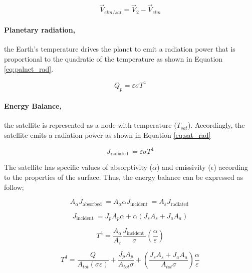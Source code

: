 \documentclass[11pt]{article}
\begin{document}
\begin{equation}
    \vec{V}_{elm/sat} = \vec{V}_{2} - \vec{V}_{elm}
\end{equation}


\paragraph{Planetary radiation,} the Earth's temperature drives the planet to emit a radiation power that is proportional to the quadratic of the temperature as shown in Equation \ref{eq:palnet_rad}.

\begin{equation}\label{eq:palnet_rad}
    Q_p = \varepsilon \sigma T^4
\end{equation}


\paragraph{Energy Balance,} the satellite is represented as a node with temperature ($T_{sat}$). Accordingly, the satellite emits a radiation power as shown in Equation \ref{eq:sat_rad}

\begin{equation}\label{eq:sat_rad}
    J_{\text {radiated }} = \varepsilon \sigma T^4
\end{equation}

The satellite has specific values of absorptivity ($\alpha$) and emissivity ($\epsilon$) according to the properties of the surface. Thus, the energy balance can be expressed as follow; 

\begin{equation}
A_\alpha J_{\text {absorbed }}=A_\alpha \alpha J_{\text {incident }}=A_{\varepsilon} J_{\text {radiated }}
\end{equation}


\begin{equation}
J_{\text {incident }} = J_p A_p \alpha +\alpha \left(J_s A_s+J_a A_a\right)
\end{equation}


\begin{equation}
T^4=\frac{A_\alpha}{A_{\varepsilon}} \frac{J_{\text {incident }}}{\sigma}\left(\frac{\alpha}{\varepsilon}\right)
\end{equation} 


\begin{equation}
T^4=\frac{Q}{A_{t o t}(\sigma \varepsilon)}+\frac{J_p A_p}{A_{t o t} \sigma}+\left(\frac{J_s A_s+J_a A_a}{A_{t o t} \sigma}\right) \frac{\alpha}{\varepsilon}
\end{equation}
\end{document}
